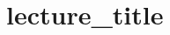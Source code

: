 \documentclass[a4paper]{report}
\begin{document}
\chapter{ {{lecture_title}} }%
\label{cha: {{lecture_title}} }
\end{document}
